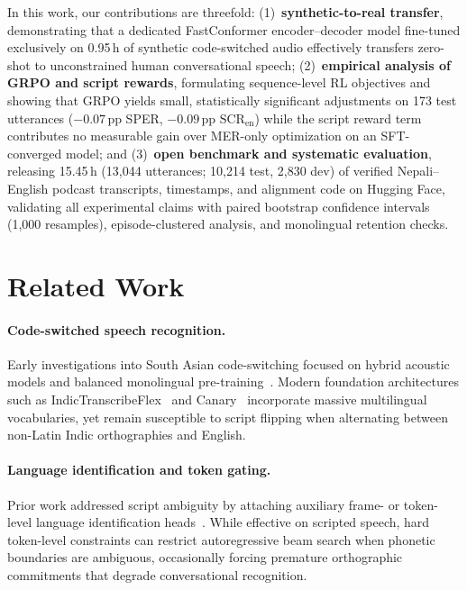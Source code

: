 \documentclass[10pt,twocolumn,a4paper]{article}
\newcommand{\pp}{\,\text{pp}}
\newcommand{\SCRen}{\text{SCR}_{\text{en}}}
\begin{document}
In this work, our contributions are threefold: (1)~\textbf{synthetic-to-real transfer}, demonstrating that a dedicated FastConformer encoder--decoder model fine-tuned exclusively on 0.95\,h of synthetic code-switched audio effectively transfers zero-shot to unconstrained human conversational speech; (2)~\textbf{empirical analysis of GRPO and script rewards}, formulating sequence-level RL objectives and showing that GRPO yields small, statistically significant adjustments on 173 test utterances ($-0.07\pp$ SPER, $-0.09\pp$ $\SCRen$) while the script reward term contributes no measurable gain over MER-only optimization on an SFT-converged model; and (3)~\textbf{open benchmark and systematic evaluation}, releasing 15.45\,h (13,044 utterances; 10,214 test, 2,830 dev) of verified Nepali--English podcast transcripts, timestamps, and alignment code on Hugging Face, validating all experimental claims with paired bootstrap confidence intervals (1,000 resamples), episode-clustered analysis, and monolingual retention checks.

\section{Related Work}
\paragraph{Code-switched speech recognition.}
Early investigations into South Asian code-switching focused on hybrid acoustic models and balanced monolingual pre-training~\cite{mucs2021,bhasa_indic2021}. Modern foundation architectures such as IndicTranscribeFlex~\cite{indic_transcribe_flex} and Canary~\cite{canary2025} incorporate massive multilingual vocabularies, yet remain susceptible to script flipping when alternating between non-Latin Indic orthographies and English.

\paragraph{Language identification and token gating.}
Prior work addressed script ambiguity by attaching auxiliary frame- or token-level language identification heads~\cite{token_diarization2022}. While effective on scripted speech, hard token-level constraints can restrict autoregressive beam search when phonetic boundaries are ambiguous, occasionally forcing premature orthographic commitments that degrade conversational recognition.
\end{document}

